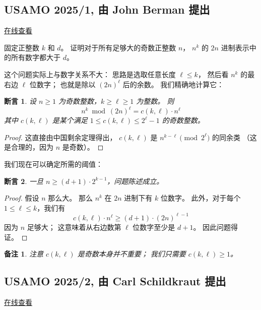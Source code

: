\documentclass[11pt]{article}
\theoremstyle{claimstyle}
\newtheorem{claim}{断言}
\theoremstyle{remarkstyle}
\newtheorem{remark}{备注}
\begin{document}
\subsection{USAMO 2025/1, 由 John Berman 提出}
\href{https://aops.com/community/p34326777}{在线查看}

\begin{problembox}
固定正整数 $k$ 和 $d$。
证明对于所有足够大的奇数正整数 $n$，
$n^k$ 的 $2n$ 进制表示中的所有数字都大于 $d$。
\end{problembox}

这个问题实际上与数字关系不大：
思路是选取任意长度 $\ell \le k$，
然后看 $n^k$ 的最右边 $\ell$ 位数字；
也就是除以 $(2n)^\ell$ 后的余数。
我们精确地计算它：

\begin{claim}
  设 $n \ge 1$ 为奇数整数，$k \ge \ell \ge 1$ 为整数。
  则
  \[ n^k \bmod{(2n)^\ell} = c(k,\ell) \cdot n^\ell \]
  其中 $c(k,\ell)$ 是某个满足 $1 \le c(k,\ell) \le 2^\ell-1$ 的奇数整数。
\end{claim}

\begin{proof}
  这直接由中国剩余定理得出，
  $c(k,\ell)$ 是 $n^{k-\ell} \pmod{2^\ell}$ 的同余类
  （这是合理的，因为 $n$ 是奇数）。
\end{proof}

我们现在可以确定所需的阈值：

\begin{claim}
  一旦 $n \ge (d+1) \cdot 2^{k-1}$，问题陈述成立。
\end{claim}

\begin{proof}
  假设 $n$ 那么大。
  那么 $n^k$ 在 $2n$ 进制下有 $k$ 位数字。
  此外，对于每个 $1 \le \ell \le k$，我们有
  \[ c(k,\ell) \cdot n^\ell \ge (d+1) \cdot (2n)^{\ell-1} \]
  因为 $n$ 足够大；
  这意味着从右边数第 $\ell$ 位数字至少是 $d+1$。
  因此问题得证。
\end{proof}

\begin{remark}
  注意 $c(k,\ell)$ 是奇数本身并不重要；
  我们只需要 $c(k,\ell) \ge 1$。
\end{remark}

\pagebreak

\subsection{USAMO 2025/2, 由 Carl Schildkraut 提出}
\href{https://aops.com/community/p34326772}{在线查看}
\end{document}
